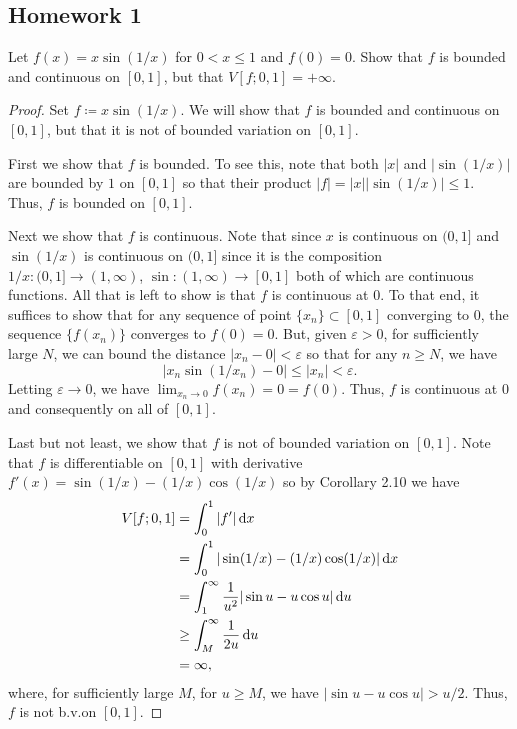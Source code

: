 \subsection{Homework 1}
\begin{problem}
  Let $f(x)=x\sin(1/x)$ for $0<x\leq 1$ and $f(0)=0$. Show that $f$ is
  bounded and continuous on $[0,1]$, but that $V[f;0,1]=+\infty$.
\end{problem}
\begin{proof}
  Set $f\coloneq x\sin (1/x)$. We will show that $f$ is bounded and
  continuous on $[0,1]$, but that it is not of bounded variation on
  $[0,1]$.

  First we show that $f$ is bounded. To see this, note that both $|x|$ and
  $|\sin (1/x)|$ are bounded by $1$ on $[0,1]$ so that their product
  $|f|=|x||\sin (1/x)|\leq 1$. Thus, $f$ is bounded on $[0,1]$.

  Next we show that $f$ is continuous. Note that since $x$ is continuous on
  $(0,1]$ and $\sin(1/x)$ is continuous on $(0,1]$ since it is the
  composition $1/x\colon (0,1]\to (1,\infty)$,
  $\sin\colon(1,\infty)\to [0,1]$ both of which are continuous
  functions. All that is left to show is that $f$ is continuous at $0$. To
  that end, it suffices to show that for any sequence of point
  ${\{x_n\}}\subset[0,1]$ converging to $0$, the sequence ${\{f(x_n)\}}$
  converges to $f(0)=0$. But, given $\varepsilon>0$, for sufficiently large
  $N$, we can bound the distance $|x_n-0|<\varepsilon$ so that for any
  $n\geq N$, we have
  \begin{equation*}
    |x_n\sin(1/x_n)-0|\leq |x_n|<\varepsilon.
  \end{equation*}
  Letting $\varepsilon\to 0$, we have $\lim_{x_n\to 0}f(x_n)=0=f(0)$. Thus,
  $f$ is continuous at $0$ and consequently on all of $[0,1]$.

  Last but not least, we show that $f$ is not of bounded variation on
  $[0,1]$. Note that $f$ is differentiable on $[0,1]$ with derivative
  $f'(x)=\sin(1/x)-(1/x)\cos(1/x)$ so by Corollary 2.10 we have
  \begin{align*}
    V[f;0,1]
    &=\int_0^1|f'|\mathop{}\!\mathrm{d} x\\
    &=\int_0^1|\sin(1/x)-(1/x)\cos(1/x)|\mathop{}\!\mathrm{d} x\\
    &=\int_1^\infty\frac{1}{u^2}|\sin u-u\cos u|\mathop{}\!\mathrm{d} u\\
    &\geq\int_M^\infty\frac{1}{2u}\mathop{}\!\mathrm{d} u\\
    &=\infty,
  \end{align*}
  where, for sufficiently large $M$, for $u\geq M$, we have
  $|\sin u-u\cos u|>u/2$. Thus, $f$ is not b.v.\@ on $[0,1]$.
\end{proof}

